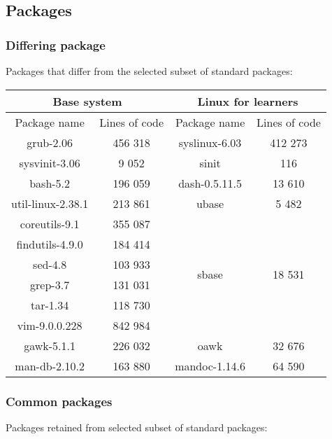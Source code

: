 \subsection{Packages}\label{Packages}

\subsubsection{Differing package}

Packages that differ from the selected subset of standard packages:

\begin{center}
    \begin{tabular}{|c|c||c|c|}
        \hline
        \multicolumn{2}{|c||}{Base system} & \multicolumn{2}{|c|}{Linux for learners} \\
        \hline
        \hline
        Package name & Lines of code & Package name & Lines of code \\
        \hline
        \hline
        grub-2.06 & 456 318 & syslinux-6.03 & 412 273 \\
        \hline
        sysvinit-3.06 & 9 052 & sinit & 116 \\
        \hline
        bash-5.2 & 196 059 & dash-0.5.11.5 & 13 610 \\
        \hline
        util-linux-2.38.1 & 213 861 & ubase & 5 482 \\
        \hline
        coreutils-9.1 & 355 087 & \multirow{6}{*}{sbase} & \multirow{6}{*}{18 531} \\
        findutils-4.9.0 & 184 414 & & \\
        sed-4.8 & 103 933 & & \\
        grep-3.7 & 131 031 & & \\
        tar-1.34 & 118 730 & & \\
        vim-9.0.0.228 & 842 984 & & \\
        \hline
        gawk-5.1.1 & 226 032 & oawk & 32 676 \\
        \hline
        man-db-2.10.2 & 163 880 & mandoc-1.14.6 & 64 590 \\
        \hline
    \end{tabular}
\end{center}

\subsubsection{Common packages}

Packages retained from selected subset of standard packages:

